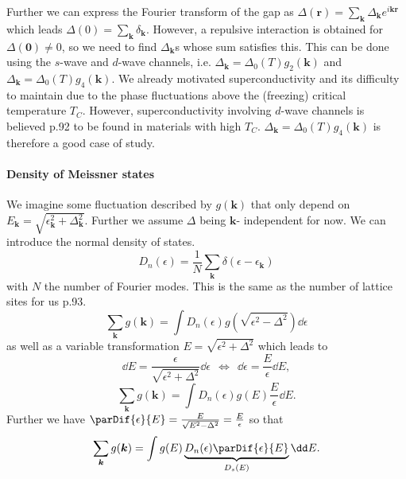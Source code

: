 \documentclass[../main.tex]{subfile}
\begin{document}
Further we can express the Fourier transform of the gap as $\Delta(\bm{r}) = \sum_{\bm{k}} \Delta_{\bm{k}} e^{i\bm{k}\bm{r}}$ which leads $\Delta(0) = \sum_{\bm{k}} \delta_{\bm{k}}$.
However, a repulsive interaction is obtained for $\Delta(\bm{0}) \neq 0$, so we need to find $\Delta_{\bm{k}}$s whose sum satisfies this. 
This can be done using the $s$-wave and $d$-wave channels, i.e. $\Delta_{\bm{k}} = \Delta_0(T)g_2(\bm{k})$ and $\Delta_{\bm{k}} = \Delta_0(T)g_4(\bm{k})$.
We already motivated superconductivity and its difficulty to maintain due to the phase fluctuations above the (freezing) critical temperature $T_C$. 
However, superconductivity involving $d$-wave channels is believed \cite{FossheimSudbo2004} p.92 to be found in materials with high $T_C$.
$\Delta_{\bm{k}} = \Delta_0(T)g_4(\bm{k})$ is therefore a good case of study.

\paragraph{Density of Meissner states} $~$\\
We imagine some fluctuation described by $g(\bm{k})$ 
that only depend on $E_{\bm{k}} = \sqrt{\epsilon_{\bm{k}}^2 + \Delta_{\bm{k}}^2}$. Further we assume $\Delta$ being $\bm{k}$-
independent for now. We can introduce the normal density of states.
\[
    D_n(\epsilon) = \frac{1}{N} \sum_{\bm{k}} \delta(\epsilon - \epsilon_{\bm{k}})  
\]
with $N$ the number of Fourier modes. This is the same as the number of lattice sites for us \cite{FossheimSudbo2004} p.93.   
\[
    \sum_{\bm{k}} g(\bm{k})= \int D_n(\epsilon)g\left(\sqrt{\epsilon^2-\Delta^2}\right) \dd \epsilon
\]
as well as a variable transformation $E = \sqrt{\epsilon^2 + \Delta^2}$ which leads to
\[
    \dd E = \frac{\epsilon}{\sqrt{\epsilon^2 + \Delta^2}} \dd \epsilon ~~ \Longleftrightarrow ~~ \dd \epsilon = \frac{E}{\epsilon} \dd E,
\]
\[
    \sum_{\bm{k}} g(\bm{k})=\int D_n(\epsilon)g(E)\frac{E}{\epsilon} \dd E.
\]
Further we have $\parDif{\epsilon}{E} = \frac{E}{\sqrt{E^2-\Delta^2}} =\frac{E}{\epsilon} $ so that
\[
    \sum_{\bm{k}} g(\bm{k}) = \int g(E)\underbrace{D_n(\epsilon)\parDif{\epsilon}{E}}_{D_s(E)} \dd E.
\]
\end{document}

